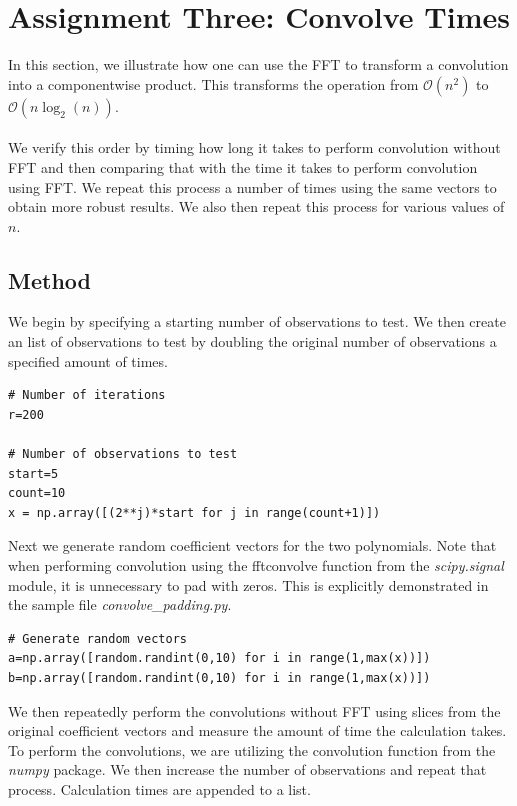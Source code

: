 
\section{Assignment Three: Convolve Times} %
\label{sec:assignment_three_convolve_times}

In this section, we illustrate how one can use the FFT to transform a convolution into a componentwise product. This transforms the operation from $\mathcal{O}(n^2)$ to $\mathcal{O}(n \log_2(n))$. 
\\\\
We verify this order by timing how long it takes to perform convolution without FFT and then comparing that with the time it takes to perform convolution using FFT. We repeat this process a number of times using the same vectors to obtain more robust results. We also then repeat this process for various values of $n$.


\subsection{Method} %
\label{sub:methodc}

We begin by specifying a starting number of observations to test. We then create an list of observations to test by doubling the original number of observations a specified amount of times. 


\begin{lstlisting}[caption={Creating a list of n observations to test},label=lst:listobs,firstnumber=24]
# Number of iterations
r=200

# Number of observations to test
start=5
count=10
x = np.array([(2**j)*start for j in range(count+1)])
\end{lstlisting}\noindent
Next we generate random coefficient vectors for the two polynomials. Note that when performing convolution using the fftconvolve function from the \emph{scipy.signal} module, it is unnecessary to pad with zeros. This is explicitly demonstrated in the sample file \emph{convolve\_padding.py}.

\begin{lstlisting}[caption={Generating Coefficient Vectors},label=lst:coefvec,firstnumber=34]
# Generate random vectors 
a=np.array([random.randint(0,10) for i in range(1,max(x))])
b=np.array([random.randint(0,10) for i in range(1,max(x))])
\end{lstlisting}\noindent
We then repeatedly perform the convolutions without FFT using slices from the original coefficient vectors and measure the amount of time the calculation takes. To perform the convolutions, we are utilizing the convolution function from the \emph{numpy} package. We then increase the number of observations and repeat that process. Calculation times are appended to a list.

